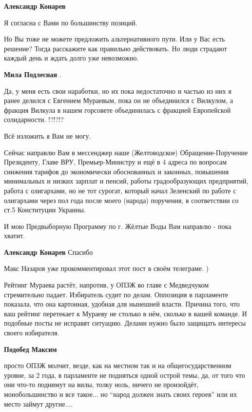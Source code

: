 \begin{itemize}
\begin{itemize}
\textbf{Александр Конарев} 

Я согласна с Вами по большинству позиций.

Но Вы тоже не можете предложить альтернативного пути. Или у Вас есть решение?
Тогда расскажите как правильно действовать. Но люди страдают каждый день и
ждать долго уже невозможно.

\textbf{Мила Подлесная} .

Да, у меня есть свои наработки, но их пока недостаточно и частью из них я ранее
делился с Евгением Мураевым, пока он не объединился с Вилкулом, а фракция
Вилкула в нашем горсовете объединилась с фракцией Европейской солидарности.
!?!?!?

Всё изложить я Вам не могу.

Сейчас направлю Вам в мессенджер наше (Желтоводское) Обращение-Поручение
Президенту, Главе ВРУ, Премьер-Министру и ещё в 4 адреса по вопросам снижения
тарифов до экономически обоснованных и законных, повышения минимальных и низких
зарплат и пенсий, работы градообразующих предприятий, работа с олигархами, но
не тот сурогат, который начал Зеленский по работе с олигархами через пол года
после моего (народа) поручения, в соответствии со ст.5 Конституции Украины.

И мою Предвыборную Программу по г. Жёлтые Воды Вам направлю - пока хватит.

\textbf{Александр Конарев} Спасибо

\end{itemize} %

Макс Назаров уже прокомментировал этот пост в своём телеграме. )


Рейтинг Мураева растёт, напротив, у ОПЗЖ во главе с Медведчуком стремительно
падает. Избиратель судит по делам. Оппозиция в парламенте показала, что она
картонная, удобная для нынешней власти. Причина того, что ваш рейтинг
перетекает к Мураеву не столько в нём, сколько в вашей команде. И подобные
посты не исправят ситуацию. Делами нужно было защищать интересы своего
избирателя.

\begin{itemize} %
\textbf{Подобед Максим} 

просто ОПЗЖ молчит, везде, как на местном так и на общегосударственном уровне,
за 2 года, в парламенте не подняться одной острой темы, да, от того что они
что-то поднимут на вилы, толку ноль, ничего не произойдёт, монобольшинство и
все такое... но \enquote{народ должен знать своих героев} или их место займут
другие....


\end{itemize}
\end{itemize}
